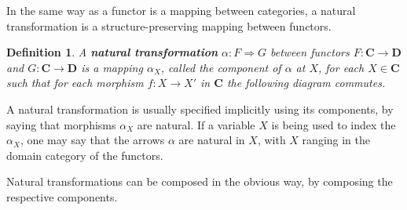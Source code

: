 \documentclass[a5paper,oneside,11pt]{article}
\newtheorem{defn}{Definition}
\newcommand\1{\mathord{\mathrm{1}}}
\newcommand\cat[1]{\mathbf{#1}}
\begin{document}
In the same way as a functor is a mapping between categories, a natural transformation
is a structure-preserving mapping between functors.
\begin{defn}
    \label{defn:natural}
    A \textbf{natural transformation} $\alpha : F \Longrightarrow G$
    between functors $F : \cat{C} \longrightarrow \cat{D}$
    and $G : \cat{C} \longrightarrow \cat{D}$ is a mapping $\alpha_X$, called
    the component of $\alpha$ at $X$, for each $X \in \cat{C}$ such that for each
    morphism $f : X \rightarrow X'$ in $\cat{C}$ the
    following diagram commutes.
    \begin{figure}[H]
        \centering
    \end{figure}
\end{defn}
A natural transformation is usually specified implicitly using its components, by
saying that morphisms $\alpha_X$ are natural. If a variable $X$ is being used
to index the $\alpha_X$, one may say that the arrows $\alpha$ are natural in $X$,
with $X$ ranging in the domain category of the functors.

Natural transformations can be composed in the obvious way, by composing the
respective components.
\end{document}

